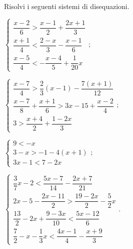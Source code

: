 \begin{esercizio}[\Ast]
 \label{ese:20.43}
 Risolvi i seguenti sistemi di disequazioni.
 \begin{multicols}{2}
 \begin{enumeratea}
\item {\longarray $\left\{\begin{array}{l}
	\dfrac{x-2}{6}>\dfrac{x-1}{2}+\dfrac{2x+1}{3}\\
	\dfrac{x+1}{4}<\dfrac{2-x}{3}-\dfrac{x-1}{6}\\
	\dfrac{x-5}{4}<-\dfrac{x-4}{5}+\dfrac{1}{20}x
	\end{array}\right.;$}
\item {\longarray $\left\{\begin{array}{l}
	\dfrac{x-7}{4}>\dfrac{2}{3}(x-1)-\dfrac{7(x+1)}{12}\\ %
	\dfrac{x-7}{8}+\dfrac{x+1}{6}>3x-15+\dfrac{x-2}{4}\\
	3>\dfrac{x+4}{2}+\dfrac{1-2x}{3}
	\end{array}\right.;$}
\item $\left\{\begin{array}{l}
	9<-x\\
	3-x>-1-4(x+1)\\
	3x-1<7-2x
	\end{array}\right.;$
\item {\longarray $\left\{\begin{array}{l}
	\dfrac{3}{7}x-2<\dfrac{5x-7}{14}-\dfrac{2x+7}{21}\\
	2x-5-\dfrac{2x-11}{2}>\dfrac{19-2x}{2}-\dfrac{5}{2}x\\
	\dfrac{13}{2}-2x+\dfrac{9-3x}{10}<\dfrac{5x-12}{6}\\
	\dfrac{7}{2}-x-\dfrac{1}{3}x<\dfrac{4x-1}{4}-\dfrac{x+9}{3}
	\end{array}\right..$}
\end{enumeratea}
\end{multicols}
\end{esercizio}

\pagebreak

